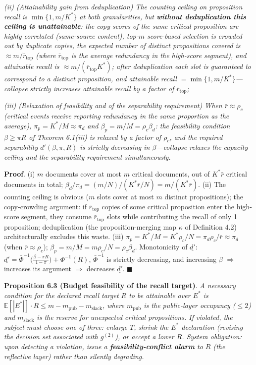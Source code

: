\documentclass[
  11pt]{article}
\begin{document}
\emph{(ii) (Attainability gain from deduplication) The counting ceiling
on proposition recall is \(\min\{1, m/K^*\}\) at both granularities, but
\textbf{without deduplication this ceiling is unattainable}: the copy
scores of the same critical proposition are highly correlated
(same-source content), top-\(m\) score-based selection is crowded out by
duplicate copies, the expected number of distinct propositions covered
is \(\approx m/\bar r_{\mathrm{top}}\) (where \(\bar r_{\mathrm{top}}\)
is the average redundancy in the high-score segment), and attainable
recall is \(\approx m/(\bar r_{\mathrm{top}}K^*)\); after deduplication
each slot is guaranteed to correspond to a distinct proposition, and
attainable recall \(= \min\{1, m/K^*\}\)---collapse strictly increases
attainable recall by a factor of \(\bar r_{\mathrm{top}}\);}

\emph{(iii) (Relaxation of feasibility and of the separability
requirement) When \(\bar r \approx \rho_c\) (critical events receive
reporting redundancy in the same proportion as the average),
\(\pi_p = K^*/M \approx \pi_d\) and \(\beta_p = m/M = \rho_c\beta_d\):
the feasibility condition \(\beta \ge \pi R\) of Theorem 6.1(iii) is
relaxed by a factor of \(\rho_c\), and the required separability
\(\underline{d'}(\beta,\pi,R)\) is strictly decreasing in
\(\beta\)---collapse relaxes the capacity ceiling and the separability
requirement simultaneously.}

\textbf{Proof}. (i) \(m\) documents cover at most \(m\) critical
documents, out of \(K^*\bar r\) critical documents in total;
\(\beta_d/\pi_d = (m/N)/(K^*\bar r/N) = m/(K^*\bar r)\). (ii) The
counting ceiling is obvious (\(m\) slots cover at most \(m\) distinct
propositions); the copy-crowding argument: if \(\bar r_{\mathrm{top}}\)
copies of some critical proposition enter the high-score segment, they
consume \(\bar r_{\mathrm{top}}\) slots while contributing the recall of
only 1 proposition; deduplication (the proposition-merging map
\(\kappa\) of Definition 4.2) architecturally excludes this waste. (iii)
\(\pi_p = K^*/M = K^*\rho_c/N = \pi_d\rho_c/\bar r \approx \pi_d\) (when
\(\bar r \approx \rho_c\));
\(\beta_p = m/M = m\rho_c/N = \rho_c\beta_d\). Monotonicity of
\(\underline{d'}\):
\(\underline{d'} = \bar\Phi^{-1}\big(\tfrac{\beta-\pi R}{1-\pi}\big) + \Phi^{-1}(R)\),
\(\bar\Phi^{-1}\) is strictly decreasing, and increasing \(\beta\)
\(\Rightarrow\) increases its argument \(\Rightarrow\) decreases
\(\underline{d'}\). \(\blacksquare\)

\textbf{Proposition 6.3 (Budget feasibility of the recall target)}.
\emph{A necessary condition for the declared recall target \(R\) to be
attainable over \(E^*\) is
\(\mathbb{E}[|E^*|] \cdot R \le m - m_{\mathrm{pub}} - m_{\mathrm{slack}}\),
where \(m_{\mathrm{pub}}\) is the public-layer occupancy (\(\le 2\)) and
\(m_{\mathrm{slack}}\) is the reserve for unexpected critical
propositions. If violated, the subject must choose one of three: enlarge
\(T\), shrink the \(E^*\) declaration (revising the decision set
associated with \(g^{(2)}\)), or accept a lower \(R\). System
obligation: upon detecting a violation, issue a
\textbf{feasibility-conflict alarm} to \(R\) (the reflective layer)
rather than silently degrading.}
\end{document}

